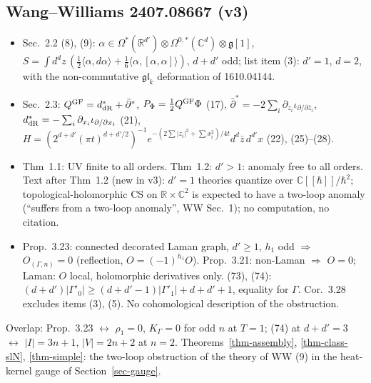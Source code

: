 \documentclass[10pt,a4paper]{article}
\numberwithin{equation}{section}
\theoremstyle{definition}
\theoremstyle{remark}
\newcommand{\g}{\mathfrak g}
\newcommand{\fgl}{\mathfrak{gl}}
\newcommand{\dbar}{\bar\partial}
\newcommand{\zb}{\bar z}
\begin{document}
\subsection{Wang--Williams 2407.08667 (v3)}
\begin{itemize}\itemsep1pt
\item Sec.~2.2 (8), (9): $\alpha\in\Omega^*(\mathbb R^{d'})\otimes\Omega^{0,*}(\mathbb C^d)\otimes\g[1]$, $S=\int d^dz\,(\frac12\langle\alpha,d\alpha\rangle+\frac16\langle\alpha,[\alpha,\alpha]\rangle)$, $d+d'$ odd; list item (3): $d'=1$, $d=2$, with the non-commutative $\fgl_k$ deformation of 1610.04144.
\item Sec.~2.3: $Q^{\rm GF}=d^*_{\rm dR}+\dbar^*$, $P_\Phi=\frac12Q^{\rm GF}\Phi$ (17), $\dbar^*=-2\sum_i\partial_{z_i}\iota_{\partial/\partial\zb_i}$, $d^*_{\rm dR}=-\sum_i\partial_{x_i}\iota_{\partial/\partial x_i}$ (21), $H=(2^{d+d'}(\pi t)^{d+d'/2})^{-1}e^{-(2\sum|z_i|^2+\sum x_i^2)/4t}d^d\zb\,d^{d'}x$ (22), (25)--(28).
\item Thm~1.1: UV finite to all orders. Thm~1.2: $d'>1$: anomaly free to all orders. Text after Thm~1.2 (new in v3): $d'=1$ theories quantize over $\mathbb C[[\hbar]]/\hbar^2$; topological-holomorphic CS on $\mathbb R\times\mathbb C^2$ is expected to have a two-loop anomaly (``suffers from a two-loop anomaly'', WW Sec.~1); no computation, no citation.
\item Prop.~3.23: connected decorated Laman graph, $d'\ge1$, $h_1$ odd $\Rightarrow$ $O_{(\Gamma,n)}=0$ (reflection, $O=(-1)^{h_1}O$). Prop.~3.21: non-Laman $\Rightarrow$ $O=0$; Laman: $O$ local, holomorphic derivatives only. (73), (74): $(d+d')|\Gamma'_0|\ge(d+d'-1)|\Gamma'_1|+d+d'+1$, equality for $\Gamma$. Cor.~3.28 excludes items (3), (5). No cohomological description of the obstruction.
\end{itemize}
Overlap: Prop.~3.23 $\leftrightarrow$ $\rho_1=0$, $K_\Gamma=0$ for odd $n$ at $T=1$; (74) at $d+d'=3$ $\leftrightarrow$ $|I|=3n+1$, $|V|=2n+2$ at $n=2$. Theorems~\ref{thm-assembly}, \ref{thm-class-slN}, \ref{thm-simple}: the two-loop obstruction of the theory of WW (9) in the heat-kernel gauge of Section~\ref{sec-gauge}.
\end{document}
